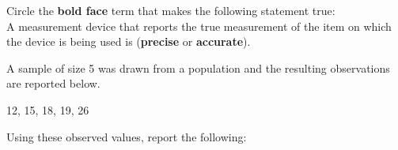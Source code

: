 \documentclass{examsetup}\usepackage[]{graphicx}\usepackage[]{color}
\begin{document}



\examCoverPage

\begin{questions}
\question[2] 

Circle the \textbf{bold face} term that makes the following statement true: \\

A measurement device that reports the true measurement of the item on which the device is being used is (\textbf{precise} or \textbf{accurate}).

\vspace{1cm}

\question 



A sample of size 5 was drawn from a population and the resulting observations are reported below. 
\begin{center}
12, 15, 18, 19, 26
\end{center}
Using these observed values, report the following:
\vspace{1cm}

\end{questions}
\end{document}
